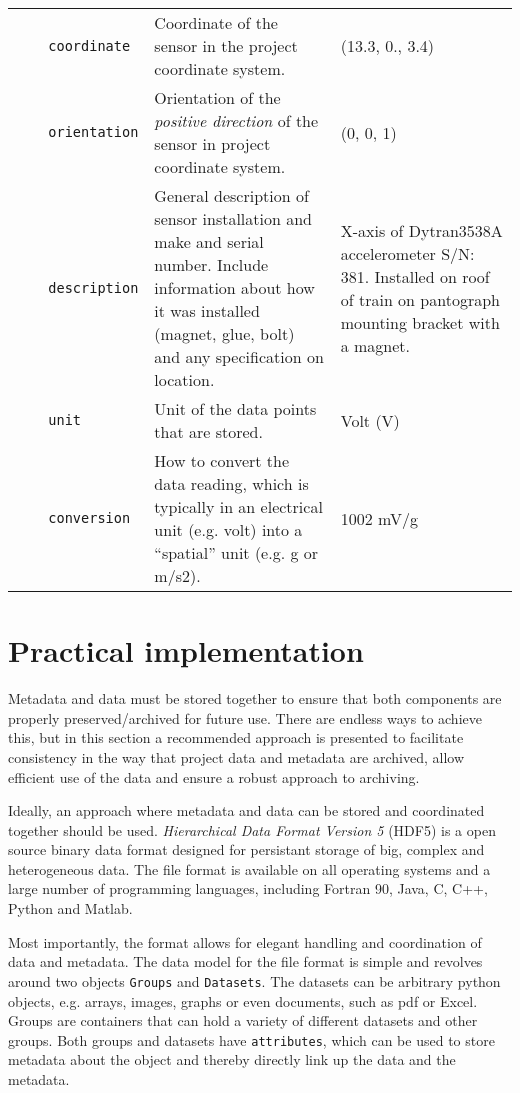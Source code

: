 \documentclass{article}
\begin{document}
\begin{sidewaystable}[htbp!]
\begin{tabular}{p{0.07\linewidth}p{0.15\linewidth}p{0.4\linewidth}p{0.4\linewidth}}
    & \texttt{coordinate} & Coordinate of the sensor in the project coordinate system. & (13.3, 0., 3.4) \\
    & \texttt{orientation} & Orientation of the \emph{positive direction} of the sensor in project coordinate system. &  (0, 0, 1)\\
    & \texttt{description} & General description of sensor installation and make and serial number. Include information about how it was installed (magnet, glue, bolt) and any specification on location. & X-axis of Dytran3538A accelerometer S/N: 381. Installed on roof of train on pantograph mounting bracket with a magnet. \\
    & \texttt{unit} & Unit of the data points that are stored. & Volt (V) \\
    & \texttt{conversion} & How to convert the data reading, which is typically in an electrical unit (e.g. volt) into a ``spatial'' unit (e.g. g or m/s2). & 1002 mV/g \\
  \bottomrule
  \end{tabular}
\end{sidewaystable}


\section{Practical implementation}

Metadata and data must be stored together to ensure that both components are properly preserved/archived for future use. There are endless ways to achieve this, but in this section a recommended approach is presented to facilitate consistency in the way that project data and metadata are archived, allow efficient use of the data and ensure a robust approach to archiving.

Ideally, an approach where metadata and data can be stored and coordinated together should be used. \emph{Hierarchical Data Format Version 5} (HDF5) is a open source binary data format designed for persistant storage of big, complex and heterogeneous data. The file format is available on all operating systems and a large number of programming languages, including Fortran 90, Java, C, C++, Python and Matlab.

Most importantly, the format allows for elegant handling and coordination of data and metadata. The data model for the file format is simple and revolves around two objects \texttt{Groups} and \texttt{Datasets}. The datasets can be arbitrary python objects, e.g. arrays, images, graphs or even documents, such as pdf or Excel. Groups are containers that can hold a variety of different datasets and other groups. Both groups and datasets have \texttt{attributes}, which can be used to store metadata about the object and thereby directly link up the data and the metadata.
\end{document}

